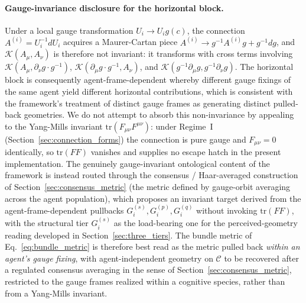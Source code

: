 \documentclass[11pt]{article}
\begin{document}
\paragraph{Gauge-invariance disclosure for the horizontal block.}
Under a local gauge transformation $U_i \to U_i g(c)$, the connection $A^{(i)} = U_i^{-1} dU_i$ acquires a Maurer-Cartan piece $A^{(i)} \to g^{-1} A^{(i)} g + g^{-1} dg$, and $\mathcal{K}(A_\mu, A_\nu)$ is therefore not invariant: it transforms with cross terms involving $\mathcal{K}(A_\mu, \partial_\nu g \cdot g^{-1})$, $\mathcal{K}(\partial_\mu g \cdot g^{-1}, A_\nu)$, and $\mathcal{K}(g^{-1} \partial_\mu g, g^{-1} \partial_\nu g)$. The horizontal block is consequently agent-frame-dependent whereby different gauge fixings of the same agent yield different horizontal contributions, which is consistent with the framework's treatment of distinct gauge frames as generating distinct pulled-back geometries. We do not attempt to absorb this non-invariance by appealing to the Yang-Mills invariant $\mathrm{tr}(F_{\mu\nu} F^{\mu\nu})$: under Regime~I (Section~\ref{sec:connection_forms}) the connection is pure gauge and $F_{\mu\nu} = 0$ identically, so $\mathrm{tr}(FF)$ vanishes and supplies no escape hatch in the present implementation. The genuinely gauge-invariant ontological content of the framework is instead routed through the consensus / Haar-averaged construction of Section~\ref{sec:consensus_metric} (the metric defined by gauge-orbit averaging across the agent population), which proposes an invariant target derived from the agent-frame-dependent pullbacks $G_i^{(s)}, G_i^{(p)}, G_i^{(q)}$ without invoking $\mathrm{tr}(FF)$, with the structural tier $G_i^{(s)}$ as the load-bearing one for the perceived-geometry reading developed in Section~\ref{sec:three_tiers}. The bundle metric of Eq.~\eqref{eq:bundle_metric} is therefore best read as the metric pulled back \emph{within an agent's gauge fixing}, with agent-independent geometry on $\mathcal{C}$ to be recovered after a regulated consensus averaging in the sense of Section~\ref{sec:consensus_metric}, restricted to the gauge frames realized within a cognitive species, rather than from a Yang-Mills invariant.
\end{document}

